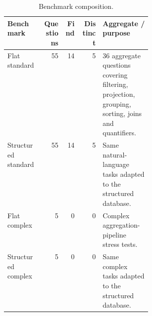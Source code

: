\begin{table}[htbp]
\centering
\small
\caption{Benchmark composition.}
\label{tab:benchmark-composition}
\begin{tabular}{lrrrp{0.34\linewidth}}
\toprule
Benchmark & Questions & Find & Distinct & Aggregate / purpose \\
\midrule
Flat standard & 55 & 14 & 5 & 36 aggregate questions covering filtering, projection, grouping, sorting, joins and quantifiers. \\
Structured standard & 55 & 14 & 5 & Same natural-language tasks adapted to the structured database. \\
Flat complex & 5 & 0 & 0 & Complex aggregation-pipeline stress tests. \\
Structured complex & 5 & 0 & 0 & Same complex tasks adapted to the structured database. \\
\bottomrule
\end{tabular}
\end{table}

